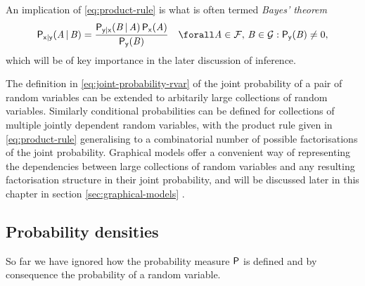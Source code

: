 An implication of \eqref{eq:product-rule} is what is often termed \emph{Bayes' theorem}
\begin{equation}\label{eq:bayes-theorem}
\begin{split}
  \prob{\rvar{x}|\rvar{y}}(\set{A} \gvn \set{B}) =
  \frac
    {\prob{\rvar{y}|\rvar{x}}(\set{B} \gvn \set{A}) \, \prob{\rvar{x}}(\set{A})}
    {\prob{\rvar{y}}(\set{B})} 
  \quad
  \forall \set{A} \in \sset{F},\,
  \set{B} \in \sset{G} : \prob{\rvar{y}}(\set{B}) \neq 0,
\end{split}
\end{equation}
which will be of key importance in the later discussion of inference.

The definition in \eqref{eq:joint-probability-rvar} of the joint probability of a pair of random variables can be extended to arbitarily large collections of random variables. Similarly conditional probabilities can be defined for collections of multiple jointly dependent random variables, with the product rule given in \eqref{eq:product-rule} generalising to a combinatorial number of possible factorisations of the joint probability. Graphical models offer a convenient way of representing the dependencies between large collections of random variables and any resulting factorisation structure in their joint probability, and will be discussed later in this chapter in section \ref{sec:graphical-models} .

\subsection{Probability densities}\label{subsec:probability-densities}

So far we have ignored how the probability measure $\mathsf{P}$ is defined and by consequence the probability of a random variable. 

